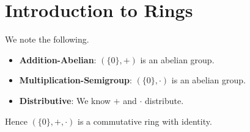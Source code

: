 \section{Introduction to Rings}
\begin{questions}
    \item We note the following.
    \begin{itemize}
        \item \textbf{Addition-Abelian}: $(\{0\}, +)$ is an abelian group.
        \item \textbf{Multiplication-Semigroup}: $(\{0\}, \cdot)$ is an abelian group.
        \item \textbf{Distributive}: We know $+$ and $\cdot$ distribute.
    \end{itemize}
    Hence $(\{0\}, +, \cdot)$ is a commutative ring with identity.
\end{questions}
